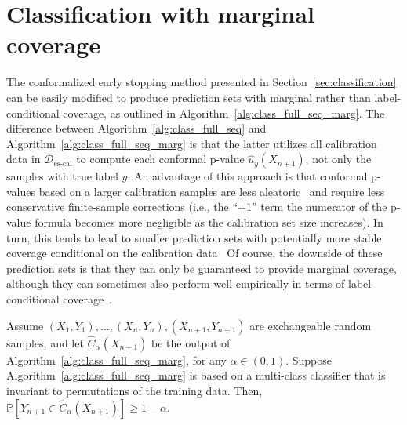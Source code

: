 \section{Classification with marginal coverage} \label{app:class-marg}

The conformalized early stopping method presented in Section~\ref{sec:classification} can be easily modified to produce prediction sets with marginal rather than label-conditional coverage, as outlined in Algorithm~\ref{alg:class_full_seq_marg}.
The difference between Algorithm~\ref{alg:class_full_seq}  and Algorithm~\ref{alg:class_full_seq_marg} is that the latter utilizes all calibration data in $\mathcal{D}_{\text{es-cal}}$ to compute each conformal p-value $\hat{u}_y(X_{n+1})$, not only the samples with true label $y$.
An advantage of this approach is that conformal p-values based on a larger calibration samples are less aleatoric~\cite{bates2021testing} and require less conservative finite-sample corrections (i.e., the ``+1'' term the numerator of the p-value formula becomes more negligible as the calibration set size increases).
In turn, this tends to lead to smaller prediction sets with potentially more stable coverage conditional on the calibration data~\cite{sesia2020comparison,bates2021testing}
Of course, the downside of these prediction sets is that they can only be guaranteed to provide marginal coverage, although they can sometimes also perform well empirically in terms of label-conditional coverage~\cite{romano2020classification}.
\begin{theorem}\label{thm:class_full_marg}
Assume $(X_{1},Y_{1}), \ldots, (X_{n},Y_{n}), (X_{n+1},Y_{n+1})$ are exchangeable random samples, and let $\hat{C}_{\alpha}(X_{n+1})$ be the output of Algorithm~\ref{alg:class_full_seq_marg}, for any $\alpha \in (0,1)$. Suppose Algorithm~\ref{alg:class_full_seq_marg} is based on a multi-class classifier that is invariant to permutations of the training data. Then, $\mathbb{P}[Y_{n+1} \in \hat{C}_{\alpha}(X_{n+1})] \geq 1-\alpha$.
\end{theorem}



